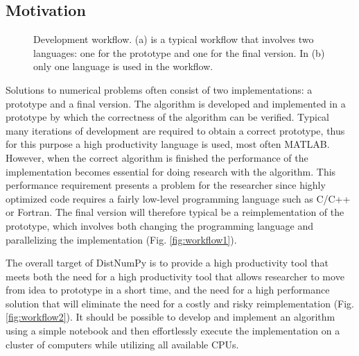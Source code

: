 \documentclass{sigplanconf}
\begin{document}
\subsection{Motivation}
\begin{figure}%
  \begin{center}%
    \qquad
    \caption{Development workflow. (a) is a typical workflow that involves two languages: one for the prototype and one for the final version. In (b) only one language is used in the workflow.
    }%
    \label{fig:workflow}%
  \end{center}
\end{figure}

Solutions to numerical problems often consist of two implementations: a prototype and a final version. The algorithm is developed and implemented in a prototype by which the correctness of the algorithm can be verified. Typical many iterations of development are required to obtain a correct prototype, thus for this purpose a high productivity language is used, most often MATLAB. However, when the correct algorithm is finished the performance of the implementation becomes essential for doing research with the algorithm. This performance requirement presents a problem for the researcher since highly optimized code requires a fairly low-level programming language such as C/C++ or Fortran. The final version will therefore typical be a reimplementation of the prototype, which involves both changing the programming language and parallelizing the implementation (Fig. \ref{fig:workflow1}). 

The overall target of DistNumPy is to provide a high productivity tool that meets both the need for a high productivity tool that allows researcher to move from idea to prototype in a short time, and the need for a high performance solution that will eliminate the need for a costly and risky reimplementation (Fig. \ref{fig:workflow2}). It should be possible to develop and implement an algorithm using a simple notebook and then effortlessly execute the implementation on a cluster of computers while utilizing all available CPUs.
\end{document}
